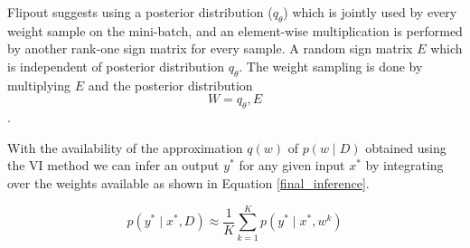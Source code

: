 \documentclass[10pt,twocolumn,letterpaper]{article}
\begin{document}
Flipout suggests using a posterior distribution ($q_{\theta}$) which is jointly used by every weight sample on the mini-batch, and an element-wise multiplication is performed by another rank-one sign matrix for every sample. A random sign matrix $E$ which is independent of posterior distribution $q_{\theta}$. The weight sampling is done by multiplying $E$ and the posterior distribution $$W = q_{\theta}, E$$.

With the availability of the approximation $q(w)$ of $p(w \mid D)$ obtained using the VI method we can infer an output $y^{*}$ for any given input $x^{*}$ by integrating over the weights available as shown in Equation \ref{final_inference}.

\begin{equation}
    \label{final_inference}
    p\left(y^{*} \mid x^{*}, D\right) \approx \frac{1}{K} \sum_{k=1}^{K} p\left(y^{*} \mid x^{*}, w^{k}\right)
\end{equation}
    
        
\end{document}
